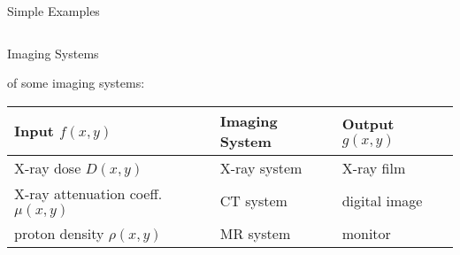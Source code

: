 \begin{frame}[c]{Simple Examples}
\begin{columns}[c, onlytextwidth]
\begin{column}{0.5\textwidth}
{\begin{center}
                \end{center}
            }
        \end{column}
    \end{columns}

\end{frame}

\begin{frame}[c]{Imaging Systems}

    \myExample{} of some imaging systems:\newline{}

    \begin{table}
        \def\arraystretch{1.7}
        \begin{tabular}{lll}
            \toprule
            Input $f(x,y)$                      & Imaging System & Output $g(x,y)$ \\
            \midrule
            X-ray dose $D(x,y)$                 & X-ray system   & X-ray film      \\
            X-ray attenuation coeff. $\mu(x,y)$ & CT system      & digital image   \\
            proton density $\rho(x,y)$          & MR system      & monitor         \\
            \bottomrule
        \end{tabular}
    \end{table}
\end{frame}





